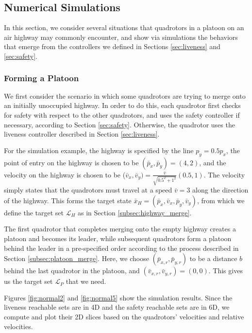 \subsection{Numerical Simulations}

In this section, we consider several situations that quadrotors in a platoon on an air highway may commonly encounter, and show via simulations the behaviors that emerge from the controllers we defined in Sections \ref{sec:liveness} and \ref{sec:safety}.

\subsubsection{Forming a Platoon}
We first consider the scenario in which some quadrotors are trying to merge onto an initially unoccupied highway. In order to do this, each quadrotor first checks for safety with respect to the other quadrotors, and uses the safety controller if necessary, according to Section \ref{sec:safety}. Otherwise, the quadrotor uses the liveness controller described in Section \ref{sec:liveness}. 

For the simulation example, the highway is specified by the line $p_y = 0.5p_x$, the point of entry on the highway is chosen to be $(\bar{p}_x, \bar{p}_y) = (4,2)$, and the velocity on the highway is chosen to be ($\bar{v}_x, \bar{v}_y) = \frac{\bar{v}}{\sqrt{0.5^2 + 1^2}} (0.5, 1)$. The velocity simply states that the quadrotors must travel at a speed $\bar{v}=3$ along the direction of the highway. This forms the target state $\bar{x}_H=(\bar{p}_x, \bar{v}_x, \bar{p}_y, \bar{v}_y)$, from which we define the target set $\mathcal{L}_H$ as in Section \ref{subsec:highway_merge}.

The first quadrotor that completes merging onto the empty highway creates a platoon and becomes its leader, while subsequent quadrotors form a platoon behind the leader in a pre-specified order according to the process described in Section \ref{subsec:platoon_merge}. Here, we choose $(\bar{p}_{x,r}, \bar{p}_{y,r})$ to be a distance $b$ behind the last quadrotor in the platoon, and $(\bar{v}_{x,r}, \bar{v}_{y,r}) = (0,0)$. This gives us the target set $\mathcal{L}_P$ that we need.

Figures \ref{fig:normal2} and \ref{fig:normal5} show the simulation results. Since the liveness reachable sets are in 4D and the safety reachable sets are in 6D, we compute and plot their 2D slices based on the quadrotors' velocities and relative velocities. 

